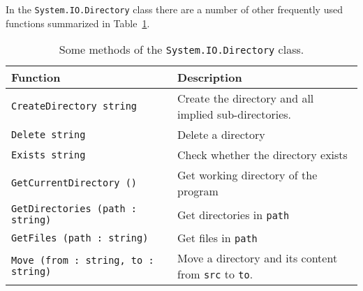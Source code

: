 In the \lstinline!System.IO.Directory! class there are a number of other frequently used functions summarized in Table~\ref{tab:directory}.
\begin{table}
  \begin{center}
    \begin{tabularx}{\linewidth}{|l|X|}
      \hline
      \rowcolor{headerRowColor}  Function & Description\\
      \hline
      \lstinline{CreateDirectory string} & Create the directory and all implied sub-directories.\\
      \hline
      \lstinline{Delete string} & Delete a directory\\
      \hline
      \lstinline{Exists string} & Check whether the directory exists\\
      \hline
      \lstinline{GetCurrentDirectory ()} & Get working directory of the program\\
      \hline
      \lstinline{GetDirectories (path : string)} & Get directories in \lstinline{path}\\
      \hline
      \lstinline{GetFiles (path : string)} & Get files in \lstinline{path}\\
      \hline
      \lstinline{Move (from : string, to : string)} & Move a directory and its content from \lstinline{src} to \lstinline{to}.\\
      \hline
    \end{tabularx}
  \end{center}
  \caption{Some methods of the \lstinline!System.IO.Directory! class.}
  \label{tab:directory}
\end{table}

